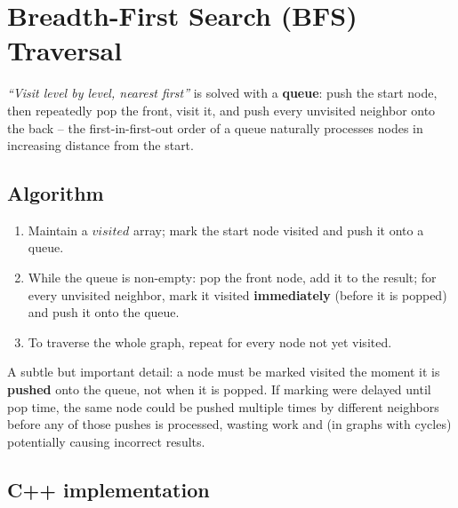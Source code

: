 \section{Breadth-First Search (BFS) Traversal}
\label{sec:graph-bfs}


\begin{patternbox}
\emph{``Visit level by level, nearest first''} is solved with a
\textbf{queue}: push the start node, then repeatedly pop the front,
visit it, and push every unvisited neighbor onto the back -- the
first-in-first-out order of a queue naturally processes nodes in
increasing distance from the start.
\end{patternbox}

\subsection*{Algorithm}

\begin{enumerate}
  \item Maintain a $\textit{visited}$ array; mark the start node
        visited and push it onto a queue.
  \item While the queue is non-empty: pop the front node, add it to
        the result; for every unvisited neighbor, mark it visited
        \textbf{immediately} (before it is popped) and push it onto
        the queue.
  \item To traverse the whole graph, repeat for every node not yet
        visited.
\end{enumerate}

\begin{ideabox}
A subtle but important detail: a node must be marked visited the
moment it is \textbf{pushed} onto the queue, not when it is popped.
If marking were delayed until pop time, the same node could be pushed
multiple times by different neighbors before any of those pushes is
processed, wasting work and (in graphs with cycles) potentially
causing incorrect results.
\end{ideabox}

\subsection*{C++ implementation}

